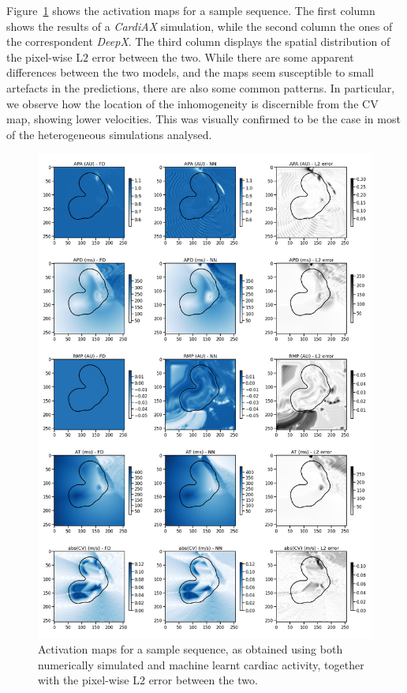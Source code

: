 \documentclass[utf8]{frontiersSCNS} %
\begin{document}
Figure~\ref{fig:12} shows the activation maps for a sample sequence. The first column shows the results of a \textit{CardiAX} simulation, while the second column the ones of the correspondent \textit{DeepX}. The third column displays the spatial distribution of the pixel-wise L$2$ error between the two.
While there are some apparent differences between the two models, and the maps seem susceptible to small artefacts in the predictions, there are also some common patterns.
In particular, we observe how the location of the inhomogeneity is discernible from the CV map, showing lower velocities. This was visually confirmed to be the case in most of the heterogeneous simulations analysed.

\begin{figure}[!htp]
\centering
\includegraphics[width=.85\textwidth]{Figure-12.png}
\caption{Activation maps for a sample sequence, as obtained using both numerically simulated and machine learnt cardiac activity, together with the pixel-wise L$2$ error between the two.
}
\label{fig:12}
\end{figure}
\end{document}
